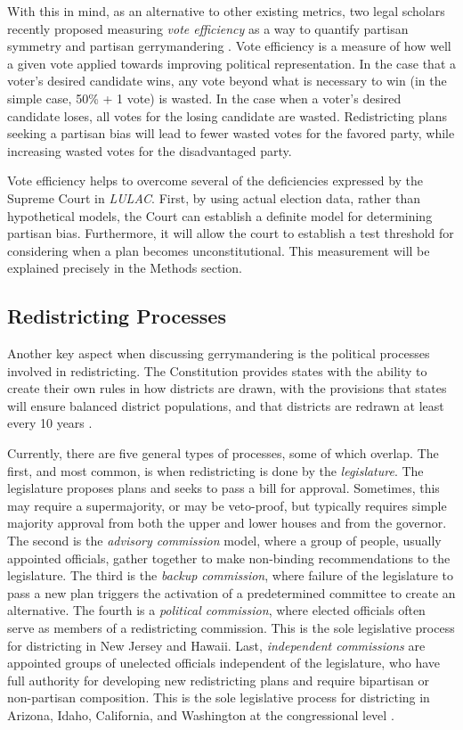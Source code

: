 \documentclass[12pt]{article}
\begin{document}
  With this in mind,  as an alternative to other existing metrics, two legal scholars recently proposed measuring \textit{vote efficiency} as a way to quantify partisan symmetry and partisan gerrymandering \cite{stephanopoulos}.  Vote efficiency is a measure of how well a given vote applied towards improving political representation.  In the case that a voter's desired candidate wins, any vote beyond what is necessary to win (in the simple case, 50\% + 1 vote) is wasted.  In the case when a voter's desired candidate loses, all votes for the losing candidate are wasted. Redistricting plans seeking a partisan bias will lead to fewer wasted votes for the favored party, while increasing wasted votes for the disadvantaged party.

  Vote efficiency helps to overcome several of the deficiencies expressed by the Supreme Court in \textit{LULAC}.  First, by using actual election data, rather than hypothetical models, the Court can establish a definite model for determining partisan bias.  Furthermore, it will allow the court to establish a test threshold for considering when a plan becomes unconstitutional.  This measurement will be explained precisely in the Methods section.

\subsection{Redistricting Processes}
Another key aspect when discussing gerrymandering is the political processes involved in redistricting.  The Constitution provides states with the ability to create their own rules in how districts are drawn, with the provisions that states will ensure balanced district populations, and that districts are redrawn at least every 10 years \cite{LULAC}.

Currently, there are five general types of processes, some of which overlap.  The first, and most common, is when redistricting is done by the \textit{legislature}.    The legislature proposes plans and seeks to pass a bill for approval.  Sometimes, this may require a supermajority, or may be veto-proof, but typically requires simple majority approval from both the upper and lower houses and from the governor.  The second is the \textit{advisory commission} model, where a group of people, usually appointed officials, gather together to make non-binding recommendations to the legislature.  The third is the \textit{backup commission}, where failure of the legislature to pass a new plan triggers the activation of a predetermined committee to create an alternative.  The fourth is a \textit{political commission}, where elected officials often serve as members of a redistricting commission.  This is the sole legislative process for districting in New Jersey and Hawaii.  Last, \textit{independent commissions} are appointed groups of unelected officials independent of the legislature, who have full authority for developing new redistricting plans and require bipartisan or non-partisan composition.  This is the sole legislative process for districting in Arizona, Idaho, California, and Washington at the congressional level \cite{Levitt}.
\end{document}
